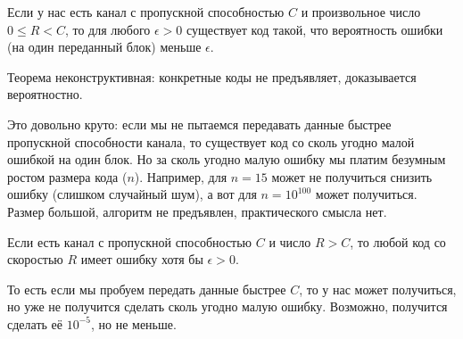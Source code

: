 \begin{theorem}
	Если у нас есть канал с пропускной способностью $C$ и произвольное число $0 \le R < C$,
	то для любого $\epsilon > 0$ существует код такой, что
	вероятность ошибки (на один переданный блок) меньше $\epsilon$.
\end{theorem}
\begin{Rem}
	Теорема неконструктивная: конкретные коды не предъявляет, доказывается вероятностно.
\end{Rem}
\begin{Rem}
	Это довольно круто: если мы не пытаемся передавать данные быстрее пропускной способности канала,
	то существует код со сколь угодно малой ошибкой на один блок.
	Но за сколь угодно малую ошибку мы платим безумным ростом размера кода ($n$).
	Например, для $n=15$ может не получиться снизить ошибку (слишком случайный шум),
	а вот для $n=10^{100}$ может получиться.
	Размер большой, алгоритм не предъявлен, практического смысла нет.
\end{Rem}
\begin{theorem}
	Если есть канал с пропускной способностью $C$ и число $R>C$,
	то любой код со скоростью $R$ имеет ошибку хотя бы $\epsilon >0 $.
\end{theorem}
\begin{Rem}
	То есть если мы пробуем передать данные быстрее $C$, то у нас может получиться,
	но уже не получится сделать сколь угодно малую ошибку.
	Возможно, получится сделать её $10^{-5}$, но не меньше.
\end{Rem}
